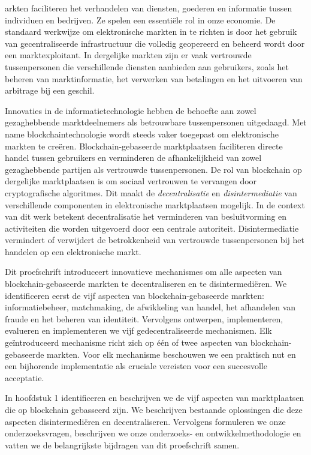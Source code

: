 {

arkten faciliteren het verhandelen van diensten, goederen en informatie tussen individuen en bedrijven.
Ze spelen een essentiële rol in onze economie.
De standaard werkwijze om elektronische markten in te richten is door het gebruik van gecentraliseerde infrastructuur die volledig geopereerd en beheerd wordt door een marktexploitant.
In dergelijke markten zijn er vaak vertrouwde tussenpersonen die verschillende diensten aanbieden aan gebruikers, zoals het beheren van marktinformatie, het verwerken van betalingen en het uitvoeren van arbitrage bij een geschil.

Innovaties in de informatietechnologie hebben de behoefte aan zowel gezaghebbende marktdeelnemers als betrouwbare tussenpersonen uitgedaagd.
Met name blockchaintechnologie wordt steeds vaker toegepast om elektronische markten te creëren.
Blockchain-gebaseerde marktplaatsen faciliteren directe handel tussen gebruikers en verminderen de afhankelijkheid van zowel gezaghebbende partijen als vertrouwde tussenpersonen.
De rol van blockchain op dergelijke marktplaatsen is om sociaal vertrouwen te vervangen door cryptografische algoritmes.
Dit maakt de \emph{decentralisatie} en \emph{disintermediatie} van verschillende componenten in elektronische marktplaatsen mogelijk.
In de context van dit werk betekent decentralisatie het verminderen van besluitvorming en activiteiten die worden uitgevoerd door een centrale autoriteit.
Disintermediatie vermindert of verwijdert de betrokkenheid van vertrouwde tussenpersonen bij het handelen op een elektronische markt.

Dit proefschrift introduceert innovatieve mechanismes om alle aspecten van blockchain-gebaseerde markten te decentraliseren en te disintermediëren.
We identificeren eerst de vijf aspecten van blockchain-gebaseerde markten: informatiebeheer, matchmaking, de afwikkeling van handel, het afhandelen van fraude en het beheren van identiteit.
Vervolgens ontwerpen, implementeren, evalueren en implementeren we vijf gedecentraliseerde mechanismen.
Elk geïntroduceerd mechanisme richt zich op één of twee aspecten van blockchain-gebaseerde markten.
Voor elk mechanisme beschouwen we een praktisch nut en een bijhorende implementatie als cruciale vereisten voor een succesvolle acceptatie.

In hoofdstuk 1 identificeren en beschrijven we de vijf aspecten van marktplaatsen die op blockchain gebasseerd zijn.
We beschrijven bestaande oplossingen die deze aspecten disintermediëren en decentraliseren.
Vervolgens formuleren we onze onderzoeksvragen, beschrijven we onze onderzoeks- en ontwikkelmethodologie en vatten we de belangrijkste bijdragen van dit proefschrift samen.

}
